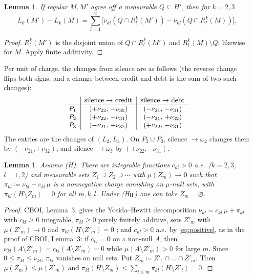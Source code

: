 \documentclass[11pt]{article}
\newtheorem{lemma}[theorem]{Lemma}
\theoremstyle{definition}\newtheorem{definition}[theorem]{Definition}
\theoremstyle{remark}\newtheorem{remark}[theorem]{Remark}
\begin{document}
\begin{lemma}\label{lem:diff}
If regular $M,M'$ agree off a measurable $Q\subseteq H'$, then for $k=2,3$
\[
 L_k(M')-L_k(M)=\sum_{l=1}^2\bigl[\nu_{kl}(Q\cap R^k_l(M'))
 -\nu_{kl}(Q\cap R^k_l(M))\bigr].
\]
\end{lemma}
\begin{proof}
$R^k_l(M')$ is the disjoint union of $Q\cap R^k_l(M')$ and
$R^k_l(M)\setminus Q$; likewise for $M$. Apply finite additivity.
\end{proof}

Per unit of charge, the changes from silence are as follows (the reverse
change flips both signs, and a change between credit and debt is the sum of
two such changes):
\begin{equation}
\begin{tabular}{c|c|c}
 & silence $\to$ credit & silence $\to$ debt\\\hline
$P_1$ & $(+\nu_{22},\,+\nu_{32})$ & $(-\nu_{21},\,-\nu_{31})$\\
$P_2$ & $(+\nu_{22},\,-\nu_{31})$ & $(-\nu_{21},\,+\nu_{32})$\\
$P_3$ & $(-\nu_{21},\,+\nu_{32})$ & $(+\nu_{22},\,-\nu_{31})$
\end{tabular}
\label{eq:table}
\end{equation}
The entries are the changes of $(L_2,L_3)$. On $P_2\cup P_3$, silence
$\to\omega_2$ changes them by $(-\nu_{21},+\nu_{32})$, and silence
$\to\omega_3$ by $(+\nu_{22},-\nu_{31})$.

\begin{lemma}\label{lem:YH}
Assume (H). There are integrable functions $c_{kl}>0$ a.e.\ ($k=2,3$,
$l=1,2$) and measurable sets $Z_1\supseteq Z_2\supseteq\cdots$ with
$\mu(Z_m)\to0$ such that $\pi_{kl}\coloneqq\nu_{kl}-c_{kl}\,\mu$ is a
nonnegative charge vanishing on $\mu$-null sets, with $\pi_{kl}(H\setminus
Z_m)=0$ for all $m,k,l$. Under (H$_{\rm II}$) one can take $Z_m=\varnothing$.
\end{lemma}
\begin{proof}
CBOI, Lemma~3, gives the Yosida--Hewitt decomposition
$\nu_{kl}=c_{kl}\,\mu+\pi_{kl}$ with $c_{kl}\ge0$ integrable, $\pi_{kl}\ge0$
purely finitely additive, sets $Z'_m$ with $\mu(Z'_m)\to0$ and
$\pi_{kl}(H\setminus Z'_m)=0$ \cite{YH,PP}; and $c_{kl}>0$ a.e.\ by
\eqref{eq:positive}, as in the proof of CBOI, Lemma~3: if $c_{kl}=0$ on a
non-null $A$, then $\nu_{kl}(A\setminus Z'_m)=c_{kl}(A\setminus Z'_m)=0$ while
$\mu(A\setminus Z'_m)>0$ for large $m$. Since $0\le\pi_{kl}\le\nu_{kl}$, $\pi_{kl}$ vanishes on null
sets. Put $Z_m\coloneqq Z'_1\cap\dots\cap Z'_m$. Then $\mu(Z_m)\le\mu(Z'_m)$
and $\pi_{kl}(H\setminus Z_m)\le\sum_{i\le m}\pi_{kl}(H\setminus Z'_i)=0$.
\end{proof}
\end{document}
